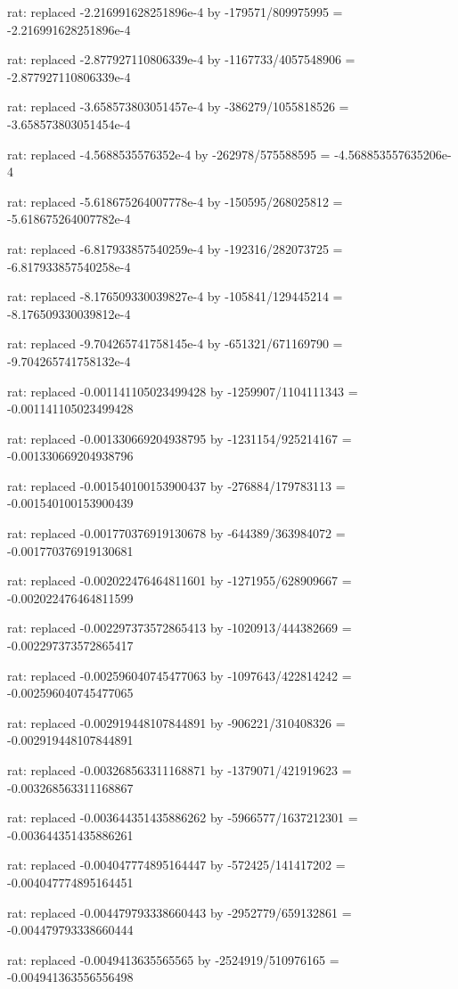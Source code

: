 \documentclass[a4paper,10pt]{article}
\begin{document}
\begin{eulernotebook}
\begin{eulercomment}
\begin{eulercomment}
\begin{eulercomment}
\begin{eulercomment}
\begin{eulercomment}
\begin{eulercomment}
\begin{eulercomment}
\begin{eulercomment}
\begin{eulercomment}
\begin{eulercomment}
\begin{eulercomment}
\begin{eulercomment}
\begin{eulercomment}
\begin{eulercomment}
\begin{eulercomment}
\begin{eulercomment}
\begin{euleroutput}
  rat: replaced -2.216991628251896e-4 by -179571/809975995 = -2.216991628251896e-4
  
  rat: replaced -2.877927110806339e-4 by -1167733/4057548906 = -2.877927110806339e-4
  
  rat: replaced -3.658573803051457e-4 by -386279/1055818526 = -3.658573803051454e-4
  
  rat: replaced -4.5688535576352e-4 by -262978/575588595 = -4.568853557635206e-4
  
  rat: replaced -5.618675264007778e-4 by -150595/268025812 = -5.618675264007782e-4
  
  rat: replaced -6.817933857540259e-4 by -192316/282073725 = -6.817933857540258e-4
  
  rat: replaced -8.176509330039827e-4 by -105841/129445214 = -8.176509330039812e-4
  
  rat: replaced -9.704265741758145e-4 by -651321/671169790 = -9.704265741758132e-4
  
  rat: replaced -0.001141105023499428 by -1259907/1104111343 = -0.001141105023499428
  
  rat: replaced -0.001330669204938795 by -1231154/925214167 = -0.001330669204938796
  
  rat: replaced -0.001540100153900437 by -276884/179783113 = -0.001540100153900439
  
  rat: replaced -0.001770376919130678 by -644389/363984072 = -0.001770376919130681
  
  rat: replaced -0.002022476464811601 by -1271955/628909667 = -0.002022476464811599
  
  rat: replaced -0.002297373572865413 by -1020913/444382669 = -0.002297373572865417
  
  rat: replaced -0.002596040745477063 by -1097643/422814242 = -0.002596040745477065
  
  rat: replaced -0.002919448107844891 by -906221/310408326 = -0.002919448107844891
  
  rat: replaced -0.003268563311168871 by -1379071/421919623 = -0.003268563311168867
  
  rat: replaced -0.003644351435886262 by -5966577/1637212301 = -0.003644351435886261
  
  rat: replaced -0.004047774895164447 by -572425/141417202 = -0.004047774895164451
  
  rat: replaced -0.004479793338660443 by -2952779/659132861 = -0.004479793338660444
  
  rat: replaced -0.0049413635565565 by -2524919/510976165 = -0.004941363556556498
  

\end{euleroutput}
\end{eulercomment}
\end{eulercomment}
\end{eulercomment}
\end{eulercomment}
\end{eulercomment}
\end{eulercomment}
\end{eulercomment}
\end{eulercomment}
\end{eulercomment}
\end{eulercomment}
\end{eulercomment}
\end{eulercomment}
\end{eulercomment}
\end{eulercomment}
\end{eulercomment}
\end{eulercomment}
\end{eulernotebook}
\end{document}
